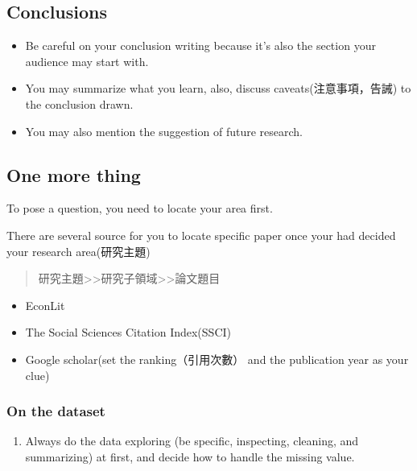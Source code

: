 \documentclass[]{book}
\providecommand{\tightlist}{%
  \setlength{\itemsep}{0pt}\setlength{\parskip}{0pt}}
\begin{document}
\hypertarget{conclusions}{%
\subsection{Conclusions}\label{conclusions}}

\begin{itemize}
\item
  Be careful on your conclusion writing because it's also the section your audience may start with.
\item
  You may summarize what you learn, also, discuss caveats(注意事項，告誡) to the conclusion drawn.
\item
  You may also mention the suggestion of future research.
\end{itemize}

\hypertarget{one-more-thing}{%
\subsection{One more thing}\label{one-more-thing}}

To pose a question, you need to locate your area first.

There are several source for you to locate specific paper once your had decided your research area(研究主題)

\begin{quote}
研究主題\textgreater{}\textgreater{}研究子領域\textgreater{}\textgreater{}論文題目
\end{quote}

\begin{itemize}
\item
  EconLit
\item
  The Social Sciences Citation Index(SSCI)
\item
  Google scholar(set the ranking（引用次數） and the publication year as your clue)
\end{itemize}

\hypertarget{on-the-dataset}{%
\subsubsection{On the dataset}\label{on-the-dataset}}

\begin{enumerate}
\def\labelenumi{\arabic{enumi}.}
\tightlist
\item
  Always do the data exploring (be specific, inspecting, cleaning, and summarizing) at first, and decide how to handle the missing value.
\end{enumerate}
\end{document}
